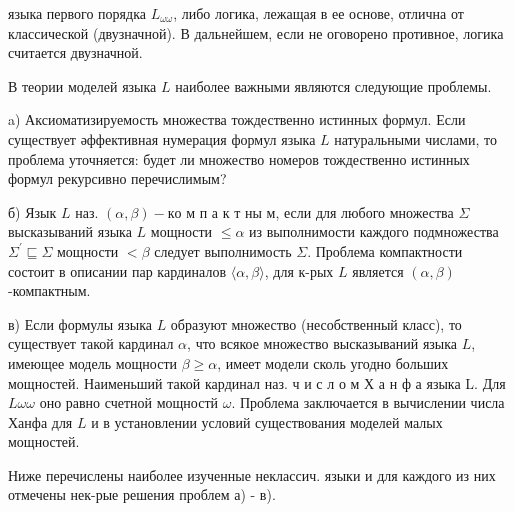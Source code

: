 \documentclass[10pt]{article}
\begin{document}
языка первого порядка $L_{\omega \omega}$, либо логика, лежащая в ее основе, отлична от классической (двузначной). В дальнейшем, если не оговорено противное, логика считается двузначной.



В теории моделей языка $L$ наиболее важными являются следующие проблемы.



a) Аксиоматизируемость множества тождественно истинных формул. Если существует әффективная нумерация формул языка $L$ натуральными числами, то проблема уточняется: будет ли множество номеров тождественно истинных формул рекурсивно перечислимым?



б) Язык $L$ наз. $(\alpha, \beta)-к о$ м п а к т ны м, если для любого множества $\Sigma$ высказываний языка $L$ мощности $\leqslant \alpha$ из выполнимости каждого подмножества $\Sigma^{\prime} \sqsubseteq \Sigma$ мощности $<\beta$ следует выполнимость $\Sigma$. Проблема компактности состоит в описании пар кардиналов $\langle\alpha, \beta\rangle$, для к-рых $L$ является $(\alpha, \beta)$-компактным.



в) Если формулы языка $L$ образуют множество (несобственный класс), то существует такой кардинал $\alpha$, что всякое множество высказываний языка $L$, имеющее модель мощности $\beta \geqslant \alpha$, имеет модели сколь угодно больших мощностей. Наименьший такой кардинал наз. ч и с л о м Х а н ф а языка L. Для $L \omega \omega$ оно равно счетной мощностй $\omega$. Проблема заключается в вычислении числа Ханфа для $L$ и в установлении условий существования моделей малых мощностей.



Ниже перечислены наиболее изученные неклассич. языки и для каждого из них отмечены нек-рые решения проблем а) - в).
\end{document}
